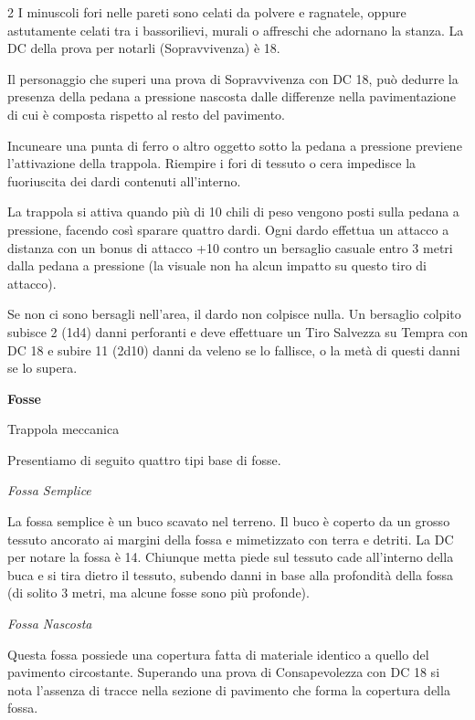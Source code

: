\begin{multicols}{2}
I minuscoli fori nelle pareti sono celati da polvere e ragnatele, oppure astutamente celati tra i bassorilievi, murali o affreschi che adornano la stanza. La DC della prova per notarli (Sopravvivenza) è 18.

Il personaggio che superi una prova di Sopravvivenza con DC 18, può dedurre la presenza della pedana a pressione nascosta dalle differenze nella pavimentazione di cui è composta rispetto al resto del pavimento.

Incuneare una punta di ferro o altro oggetto sotto la pedana a pressione previene l'attivazione della trappola. Riempire i fori di tessuto o cera impedisce la fuoriuscita dei dardi contenuti all'interno.

La trappola si attiva quando più di 10 chili di peso vengono posti sulla pedana a pressione, facendo così sparare quattro dardi. Ogni dardo effettua un attacco a distanza con un bonus di attacco +10 contro un bersaglio casuale entro 3 metri dalla pedana a pressione (la visuale non ha alcun impatto su questo tiro di attacco).

Se non ci sono bersagli nell'area, il dardo non colpisce nulla. Un bersaglio colpito subisce 2 (1d4) danni perforanti e deve effettuare un Tiro Salvezza su Tempra con DC 18 e subire 11 (2d10) danni da veleno se lo fallisce, o la metà di questi danni se lo supera.

\medskip

\textbf{Fosse}

Trappola meccanica

Presentiamo di seguito quattro tipi base di fosse.

\medskip

\emph{Fossa Semplice}

La fossa semplice è un buco scavato nel terreno. Il buco è coperto da un grosso tessuto ancorato ai margini della fossa e mimetizzato con terra e detriti.
La DC per notare la fossa è 14. Chiunque metta piede sul tessuto cade all'interno della buca e si tira dietro il tessuto, subendo danni in base alla profondità della fossa (di solito 3 metri, ma alcune fosse sono più profonde).

\medskip

\emph{Fossa Nascosta}

Questa fossa possiede una copertura fatta di materiale identico a quello del pavimento circostante.
Superando una prova di Consapevolezza con DC 18 si nota l'assenza di tracce nella sezione di pavimento che forma la copertura della fossa.


\end{multicols}
